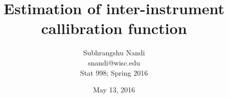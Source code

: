 \documentclass[12pt]{article}
\begin{document}
\title{Estimation of inter-instrument callibration function}

\author{Subhrangshu Nandi \\
	snandi@wisc.edu \\	
	Stat 998; Spring 2016}
\date{May 13, 2016}

\maketitle









\newpage
\begin{appendix}

\end{appendix}
\end{document}
